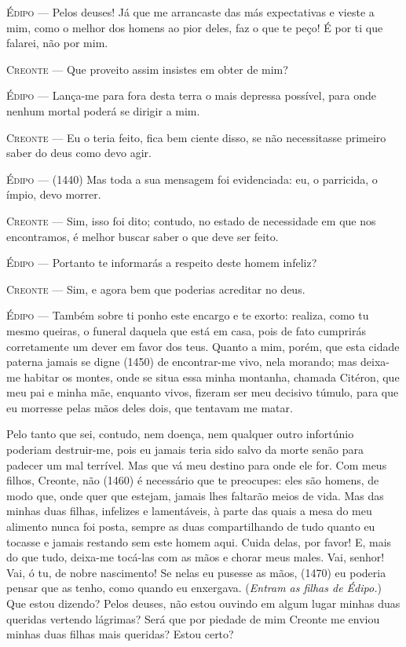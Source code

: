 \textsc{Édipo} --- Pelos deuses! Já que me arrancaste das más expectativas e vieste a mim,
como o melhor dos homens ao pior deles, faz o que te peço! É por ti que
falarei, não por mim.

\textsc{Creonte} --- Que proveito assim insistes em obter de mim?

\textsc{Édipo} --- Lança-me para fora desta terra o mais depressa possível, para onde
nenhum mortal poderá se dirigir a mim.

\textsc{Creonte} --- Eu o teria feito, fica bem ciente disso, se não necessitasse primeiro
saber do deus como devo agir.

\textsc{Édipo} --- (1440) Mas toda a sua mensagem foi evidenciada: eu, o parricida, o
ímpio, devo morrer.

\textsc{Creonte} --- Sim, isso foi dito; contudo, no estado de necessidade em que nos
encontramos, é melhor buscar saber o que deve ser feito.

\textsc{Édipo} --- Portanto te informarás a respeito deste homem infeliz?

\textsc{Creonte} --- Sim, e agora bem que poderias acreditar no deus.

\textsc{Édipo} --- Também sobre ti ponho este encargo e te exorto: realiza, como tu mesmo
queiras, o funeral daquela que está em casa, pois de fato cumprirás
corretamente um dever em favor dos teus. Quanto a mim, porém, que esta
cidade paterna jamais se digne (1450) de encontrar-me vivo, nela
morando; mas deixa-me habitar os montes, onde se situa essa minha
montanha, chamada Citéron, que meu pai e minha mãe, enquanto vivos,
fizeram ser meu decisivo túmulo, para que eu morresse pelas mãos deles
dois, que tentavam me matar.

Pelo tanto que sei, contudo, nem doença, nem qualquer outro infortúnio
poderiam destruir-me, pois eu jamais teria sido salvo da morte senão
para padecer um mal terrível. Mas que vá meu destino para onde ele for.
Com meus filhos, Creonte, não (1460) é necessário que te preocupes: eles
são homens, de modo que, onde quer que estejam, jamais lhes faltarão
meios de vida. Mas das minhas duas filhas, infelizes e lamentáveis, à
parte das quais a mesa do meu alimento nunca foi posta, sempre as duas
compartilhando de tudo quanto eu tocasse e jamais restando sem este
homem aqui. Cuida delas, por favor! E, mais do que tudo, deixa-me
tocá-las com as mãos e chorar meus males. Vai, senhor! Vai, ó tu, de
nobre nascimento! Se nelas eu pusesse as mãos, (1470) eu poderia pensar
que as tenho, como quando eu enxergava. (\emph{Entram as filhas de
Édipo.}) Que estou dizendo? Pelos deuses, não estou ouvindo em algum
lugar minhas duas queridas vertendo lágrimas? Será que por piedade de
mim Creonte me enviou minhas duas filhas mais queridas? Estou certo?

